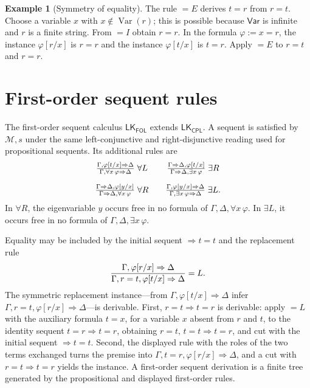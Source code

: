 \documentclass[11pt,oneside,openany]{book}
\theoremstyle{definition}
\newtheorem{example}[definition]{Example}
\theoremstyle{plain}
\theoremstyle{remark}
\newcommand{\Meta}{\mathcal{M}}
\newcommand{\Var}{\mathsf{Var}}
\newcommand{\LK}{\mathsf{LK}}
\newcommand{\CPL}{\mathsf{CPL}}
\newcommand{\FOL}{\mathsf{FOL}}
\newcommand{\Rule}[3][]{\frac{#2}{#3}\;\textsc{#1}}
\newcommand{\defeq}{\mathrel{:=}}
\begin{document}
\begin{example}[Symmetry of equality]
The rule \(=E\) derives \(t=r\) from \(r=t\).  Choose a variable \(x\)
with \(x\notin\operatorname{Var}(r)\); this is possible because \(\Var\)
is infinite and \(r\) is a finite string.  From \(=I\) obtain
\(r=r\).  In the formula \(\varphi\defeq x=r\), the instance
\(\varphi[r/x]\) is \(r=r\) and the instance \(\varphi[t/x]\) is
\(t=r\).  Apply \(=E\) to \(r=t\) and \(r=r\).
\end{example}

\section{First-order sequent rules}
\label{sec:fol-deduction-02}

The first-order sequent calculus \(\LK_{\FOL}\) extends
\(\LK_{\CPL}\).  A sequent is satisfied by \(\Meta,s\) under the same
left-conjunctive and right-disjunctive reading used for propositional
sequents.  Its additional rules are
\[
\begin{array}{c@{\qquad}c}
\Rule[\(\forall L\)]{\Gamma,\varphi[t/x]\Rightarrow\Delta}
 {\Gamma,\forall x\,\varphi\Rightarrow\Delta}
&
\Rule[\(\exists R\)]{\Gamma\Rightarrow\Delta,\varphi[t/x]}
 {\Gamma\Rightarrow\Delta,\exists x\,\varphi}
\\[2.8ex]
\Rule[\(\forall R\)]{\Gamma\Rightarrow\Delta,\varphi[y/x]}
 {\Gamma\Rightarrow\Delta,\forall x\,\varphi}
&
\Rule[\(\exists L\)]{\Gamma,\varphi[y/x]\Rightarrow\Delta}
 {\Gamma,\exists x\,\varphi\Rightarrow\Delta}.
\end{array}
\]
In \(\forall R\), the eigenvariable \(y\) occurs free in no formula of
\(\Gamma,\Delta,\forall x\,\varphi\).  In \(\exists L\), it occurs free in
no formula of \(\Gamma,\Delta,\exists x\,\varphi\).

Equality may be included by the initial sequent
\(\Rightarrow t=t\) and the replacement rule
\[
 \Rule[\(=L\)]{
   \Gamma,\varphi[r/x]\Rightarrow\Delta}
  {\Gamma,r=t,\varphi[t/x]\Rightarrow\Delta}.
\]
The symmetric replacement instance---from
\(\Gamma,\varphi[t/x]\Rightarrow\Delta\) infer
\(\Gamma,r=t,\varphi[r/x]\Rightarrow\Delta\)---is derivable.  First,
\(r=t\Rightarrow t=r\) is derivable: apply \(=L\) with the auxiliary
formula \(t=x\), for a variable \(x\) absent from \(r\) and \(t\), to
the identity sequent \(t=r\Rightarrow t=r\), obtaining
\(r=t,\,t=t\Rightarrow t=r\), and cut with the initial sequent
\(\Rightarrow t=t\).  Second, the displayed rule with the roles of the two
terms exchanged turns the premise into
\(\Gamma,t=r,\varphi[r/x]\Rightarrow\Delta\), and a cut with
\(r=t\Rightarrow t=r\) yields the instance.  A first-order sequent
derivation is a
finite tree generated by the propositional and displayed first-order rules.
\end{document}
